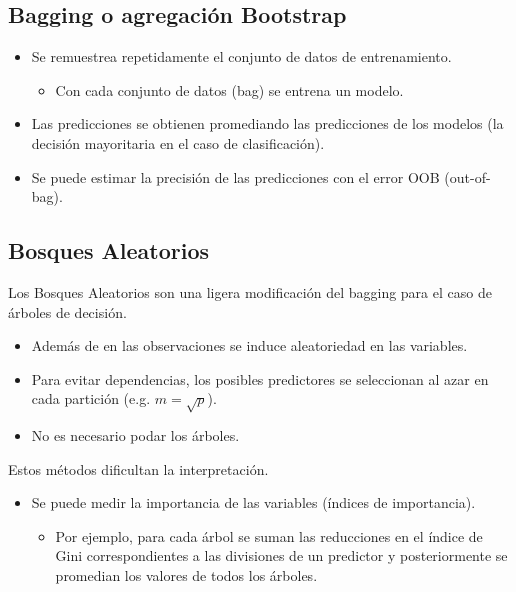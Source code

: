 \documentclass[]{book}
\providecommand{\tightlist}{%
  \setlength{\itemsep}{0pt}\setlength{\parskip}{0pt}}
\begin{document}
\subsection{Bagging o agregación
Bootstrap}\label{bagging-o-agregacion-bootstrap}

\begin{itemize}
\item
  Se remuestrea repetidamente el conjunto de datos de entrenamiento.

  \begin{itemize}
  \tightlist
  \item
    Con cada conjunto de datos (bag) se entrena un modelo.
  \end{itemize}
\item
  Las predicciones se obtienen promediando las predicciones de los
  modelos (la decisión mayoritaria en el caso de clasificación).
\item
  Se puede estimar la precisión de las predicciones con el error OOB
  (out-of-bag).
\end{itemize}

\subsection{Bosques Aleatorios}\label{bosques-aleatorios}

Los Bosques Aleatorios son una ligera modificación del bagging para el
caso de árboles de decisión.

\begin{itemize}
\item
  Además de en las observaciones se induce aleatoriedad en las
  variables.
\item
  Para evitar dependencias, los posibles predictores se seleccionan al
  azar en cada partición (e.g. \(m=\sqrt{p}\)).
\item
  No es necesario podar los árboles.
\end{itemize}

Estos métodos dificultan la interpretación.

\begin{itemize}
\item
  Se puede medir la importancia de las variables (índices de
  importancia).

  \begin{itemize}
  \tightlist
  \item
    Por ejemplo, para cada árbol se suman las reducciones en el índice
    de Gini correspondientes a las divisiones de un predictor y
    posteriormente se promedian los valores de todos los árboles.
  \end{itemize}
\end{itemize}
\end{document}
